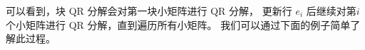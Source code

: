 

  可以看到，块 QR 分解会对第一块小矩阵进行 QR 分解，
  更新行 $e_{i}$ 后继续对第$i$个小矩阵进行 QR 分解，直到遍历所有小矩阵。
  我们可以通过下面的例子简单了解此过程。

